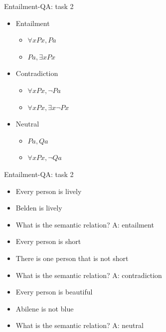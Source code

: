 \documentclass[10pt]{beamer}
\begin{document}
\begin{frame}{Entailment-QA: task 2}

\begin{itemize}
\item \alert{Entailment}
\begin{itemize}
\item $\forall x Px, Pa$ 
\item $Pa, \exists x Px$ 
\end{itemize}
\item \alert{Contradiction}
\begin{itemize}
\item $\forall x Px, \lnot Pa$ 
\item $\forall x Px, \exists x \lnot Px$ 
\end{itemize}
\item \alert{Neutral}
\begin{itemize}
\item $Pa,Qa$ 
\item $\forall x Px, \lnot Qa$ 
\end{itemize}
\end{itemize}
\end{frame}


\begin{frame}{Entailment-QA: task 2}

\begin{itemize} 
\item[] Every person is lively
\item[] Belden is lively
\item[] What is the semantic relation? \alert{A: entailment}
\end{itemize}

\begin{itemize} 
\item[] Every person is short
\item[] There is one person that is not short
\item[] What is the semantic relation?  \alert{A: contradiction}
\end{itemize}

\begin{itemize} 
\item[] Every person is beautiful
\item[] Abilene is not blue
\item[] What is the semantic relation? \alert{A: neutral}
\end{itemize}
\end{frame}
\end{document}
